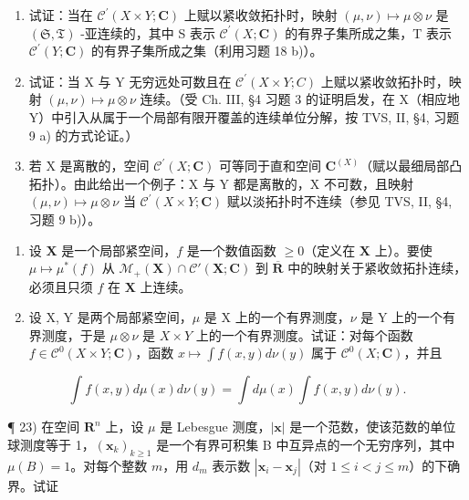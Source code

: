 \begin{enumerate}
\def\labelenumi{\alph{enumi})}
\item
  试证：当在 \(\mathcal{C}^{\prime}(X\times Y;\mathbf{C})\) 上赋以紧收敛拓扑时，映射 \((\mu,\nu)\mapsto\mu\otimes\nu\) 是 \((\mathfrak{S},\mathfrak{T})\) -亚连续的，其中 S 表示 \(\mathcal{C}^{\prime}(X;\mathbf{C})\) 的有界子集所成之集，T 表示 \(\mathcal{C}^{\prime}(Y;\mathbf{C})\) 的有界子集所成之集（利用习题 18 b)）。
\item
  试证：当 X 与 Y 无穷远处可数且在 \(\mathcal{C}^{\prime}(X\times Y;C)\) 上赋以紧收敛拓扑时，映射 \((\mu,\nu)\mapsto\mu\otimes\nu\) 连续。（受 Ch. III, §4 习题 3 的证明启发，在 X（相应地 Y）中引入从属于一个局部有限开覆盖的连续单位分解，按 TVS, II, §4, 习题 9 a) 的方式论证。）
\item
  若 X 是离散的，空间 \(\mathcal{C}^{\prime}(X;\mathbf{C})\) 可等同于直和空间 \(\mathbf{C}^{(X)}\)（赋以最细局部凸拓扑）。由此给出一个例子：X 与 Y 都是离散的，X 不可数，且映射 \((\mu,\nu)\mapsto\mu\otimes\nu\) 当 \(\mathcal{C}^{\prime}(X\times Y;\mathbf{C})\) 赋以淡拓扑时不连续（参见 TVS, II, §4, 习题 9 b)）。
\end{enumerate}

\begin{enumerate}
\def\labelenumi{\arabic{enumi})}
\setcounter{enumi}{20}
\item
  设 \(\mathbf{X}\) 是一个局部紧空间，\(f\) 是一个数值函数 \(\geqslant 0\)（定义在 \(\mathbf{X}\) 上）。要使 \(\mu \mapsto \mu^{*}(f)\) 从 \(\mathcal{M}_{+}(\mathbf{X}) \cap \mathcal{C}'(\mathbf{X};\mathbf{C})\) 到 \(\overline{\mathbf{R}}\) 中的映射关于紧收敛拓扑连续，必须且只须 \(f\) 在 \(\mathbf{X}\) 上连续。
\item
  设 X, Y 是两个局部紧空间，\(\mu\) 是 X 上的一个有界测度，\(\nu\) 是 Y 上的一个有界测度，于是 \(\mu \otimes \nu\) 是 \(X \times Y\) 上的一个有界测度。试证：对每个函数 \(f \in \mathcal{C}^{0}(X \times Y; \mathbf{C})\)，函数 \(x \mapsto \int f(x, y) d\nu(y)\) 属于 \(\mathcal{C}^{0}(X; \mathbf{C})\)，并且
\end{enumerate}

\[
\int f (x, y) d \mu (x) d \nu (y) = \int d \mu (x) \int f (x, y) d \nu (y).
\]

¶ 23) 在空间 \(\mathbf{R}^n\) 上，设 \(\mu\) 是 Lebesgue 测度，\(|\mathbf{x}|\) 是一个范数，使该范数的单位球测度等于 1，\((\mathbf{x}_k)_{k \geqslant 1}\) 是一个有界可积集 B 中互异点的一个无穷序列，其中 \(\mu(B) = 1\)。对每个整数 \(m\)，用 \(d_m\) 表示数 \(|\mathbf{x}_i - \mathbf{x}_j|\)（对 \(1 \leqslant i < j \leqslant m\)）的下确界。试证

